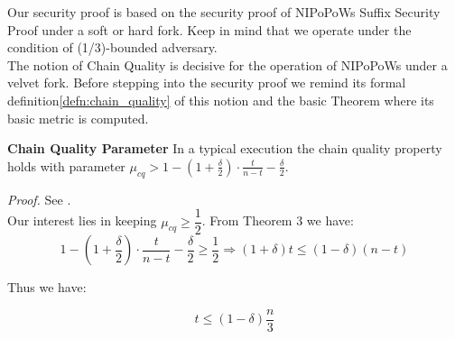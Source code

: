 Our security proof is based on the security proof of NIPoPoWs Suffix Security Proof
under a soft or hard fork. Keep in mind that we operate under the condition of
(1/3)-bounded adversary.\\

The notion of Chain Quality is decisive for the operation of NIPoPoWs under a
velvet fork. Before stepping into the security proof we remind its formal
definition\ref{defn:chain_quality} of this notion and the basic Theorem where its basic metric is computed.\\


\begin{thm}{\textbf{Chain Quality Parameter}}
	In a typical execution the chain quality property holds with parameter $\mu_{cq} > 1 - (1 + \frac{\delta}{2}) \cdot \frac{t}{n-t} - \frac{\delta}{2}$.
\end{thm}
\textit{Proof.} See \cite{Backbone}.\\

Our interest lies in keeping $\mu_{cq} \geq \dfrac{1}{2}$.
From Theorem 3 we have:
\begin{equation*}
	1 - (1 + \frac{\delta}{2}) \cdot \frac{t}{n-t} - \frac{\delta}{2} \geq \dfrac{1}{2} \Rightarrow 
	(1 + \delta)t \leq (1-\delta)(n-t)
\end{equation*}

Thus we have:
\begin{center}
\begin{equation}
	t \leq (1 - \delta)\dfrac{n}{3}
\end{equation}
\end{center}


